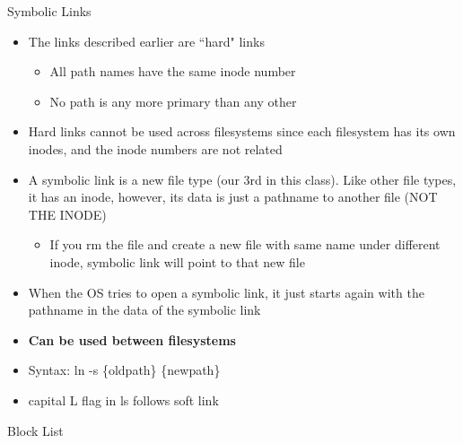 Symbolic Links
\begin{itemize}
    \item The links described earlier are ``hard" links
    \begin{itemize}
        \item All path names have the same inode number
        \item No path is any more primary than any other
    \end{itemize}
    \item Hard links cannot be used across filesystems since each filesystem has its own inodes, and the inode numbers are not related
    \item A symbolic link is a new file type (our 3rd in this class). Like other file types, it has an inode, however, its data is just a pathname to another file (NOT THE INODE)
    \begin{itemize}
        \item If you rm the file and create a new file with same name under different inode, symbolic link will point to that new file
    \end{itemize}
    \item When the OS tries to open a symbolic link, it just starts again with the pathname in the data of the symbolic link
    \item \textbf{Can be used between filesystems}
    \item Syntax: ln -s \{oldpath\} \{newpath\}
    \item capital L flag in ls follows soft link
\end{itemize}
Block List
